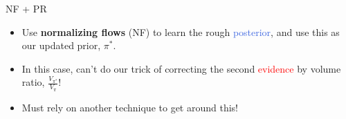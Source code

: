 \documentclass[aspectratio=169, 11pt]{beamer}
\begin{document}


\begin{frame}{NF + PR}
\begin{itemize}\vspace{1em}
    \item<1-> Use \textbf{normalizing flows} (NF) to learn the rough \textcolor{RoyalBlue}{posterior}, and use this as our updated prior, $\pi^\ast$.
    \item<1-> In this case, can't do our trick of correcting the second \textcolor{red}{evidence} by volume ratio, $\frac{V_{\pi^\ast}}{V_{\pi}}$!
    \item<1-> Must rely on another technique to get around this!
\end{itemize}\vspace{2em}
\hspace{2em}\vfill
\begin{minipage}{1\textwidth}
\end{minipage}
\end{frame}
\end{document}
